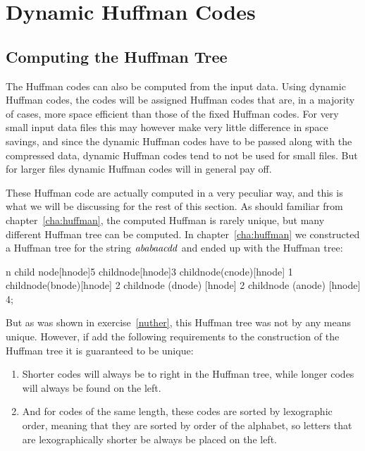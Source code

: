 \section{Dynamic Huffman Codes}
\label{sec:dynamic-huffman-codes}

\subsection{Computing the Huffman Tree}

The Huffman codes can also be computed from the input data. Using
dynamic Huffman codes, the codes will be assigned Huffman codes that
are, in a majority of cases, more space efficient than those of the
fixed Huffman codes. For very small input data files this may however
make very little difference in space savings, and since the dynamic
Huffman codes have to be passed along with the compressed data,
dynamic Huffman codes tend to not be used for small files. But for
larger files dynamic Huffman codes will in general pay off.

These Huffman code are actually computed in a very peculiar way, and
this is what we will be discussing for the rest of this section. As should
familiar from chapter~\ref{cha:huffman}, the computed Huffman is
rarely unique, but many different Huffman tree can be computed. In
chapter~\ref{cha:huffman} we constructed a Huffman tree for the string
$\mathit{ababaacdd}$ and ended up with the Huffman tree:

\begin{huffmanc}
n  
  child {node[hnode]{5}
    child{node[hnode]{3}
      child{node(cnode)[hnode] {1}}
      child{node(bnode)[hnode] {2}}}
    child{node (dnode) [hnode] {2}}}
  child{node (anode) [hnode] {4}};

\end{huffmanc}

But as was shown in exercise~\ref{nuther}, this Huffman tree was not
by any means unique. However, if add the following requirements to the
construction of the Huffman tree it is guaranteed to be unique:

\begin{enumerate}
\item Shorter codes will always be to right in the Huffman tree, while
  longer codes will always be found on the left.
\item And for codes of the same length, these codes are sorted by
  lexographic order, meaning that they are sorted by order of the
  alphabet, so letters that are lexographically shorter be always be
  placed on the left.
\end{enumerate}

